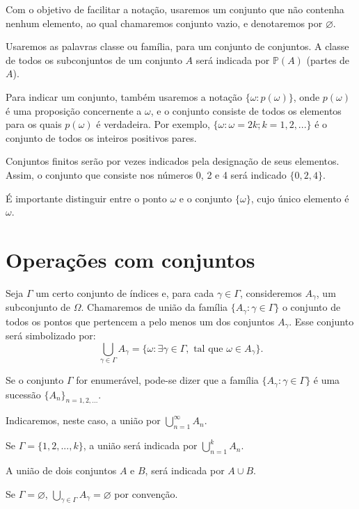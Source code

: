 \documentclass[
]{book}
\begin{document}
Com o objetivo de facilitar a notação, usaremos um conjunto que não contenha nenhum elemento, ao qual chamaremos conjunto vazio, e denotaremos por \(\varnothing\).

Usaremos as palavras classe ou família, para um conjunto de conjuntos.
A classe de todos os subconjuntos de um conjunto \(A\) será indicada por \(\mathbb{P}(A)\) (partes de \(A\)).

Para indicar um conjunto, também usaremos a notação \(\{\omega: p(\omega)\}\), onde \(p(\omega)\) é uma proposição concernente a \(\omega\), e o conjunto consiste de todos os elementos para os quais \(p(\omega)\) é verdadeira.
Por exemplo, \(\{\omega: \omega = 2k; k=1, 2, ...\}\) é o conjunto de todos os inteiros positivos pares.

Conjuntos finitos serão por vezes indicados pela designação de seus elementos.
Assim, o conjunto que consiste nos números 0, 2 e 4 será indicado \(\{0, 2, 4\}\).

É importante distinguir entre o ponto \(\omega\) e o conjunto \(\{\omega\}\), cujo único elemento é \(\omega\).

\section{Operações com conjuntos}\label{cap02}

Seja \(\Gamma\) um certo conjunto de índices e, para cada \(\gamma \in \Gamma\), consideremos \(A_{\gamma}\), um subconjunto de \(\Omega\).
Chamaremos de união da família \(\{A_{\gamma}: \gamma \in \Gamma\}\) o conjunto de todos os pontos que pertencem a pelo menos um dos conjuntos \(A_{\gamma}\).
Esse conjunto será simbolizado por: \[ \bigcup_{\gamma \in \Gamma} A_{\gamma} = \{\omega: \exists \gamma \in \Gamma, \text{ tal que } \omega \in A_{\gamma}\}. \]

Se o conjunto \(\Gamma\) for enumerável, pode-se dizer que a família \(\{A_{\gamma}: \gamma \in \Gamma\}\) é uma sucessão \(\{A_n\}_{n=1,2,...}\).

Indicaremos, neste caso, a união por \(\bigcup\limits_{n=1}^{\infty} A_n\).

Se \(\Gamma = \{1, 2, ..., k\}\), a união será indicada por \(\bigcup\limits_{n=1}^{k} A_n\).

A união de dois conjuntos \(A\) e \(B\), será indicada por \(A \cup B\).

Se \(\Gamma = \varnothing\), \(\bigcup\limits_{\gamma \in \Gamma} A_{\gamma} = \varnothing\) por convenção.
\end{document}
